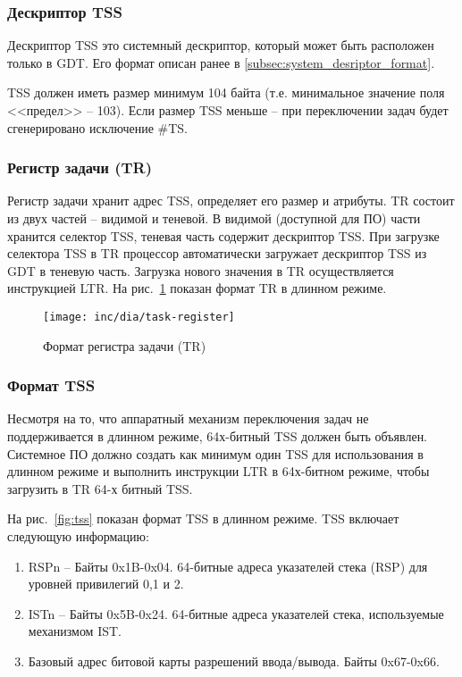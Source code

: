 \subsubsection*{Дескриптор TSS}
Дескриптор TSS это системный дескриптор, который может быть расположен только
в GDT. Его формат описан ранее в \ref{subsec:system_desriptor_format}.

TSS должен иметь размер минимум 104 байта (т.е. минимальное значение поля <<предел>> -- 103).
Если размер TSS меньше -- при переключении задач будет сгенерировано исключение \#TS.

\subsubsection*{Регистр задачи (TR)}
Регистр задачи хранит адрес TSS, определяет его размер и атрибуты. TR состоит
из двух частей -- видимой и теневой. В видимой (доступной для ПО) части хранится селектор TSS,
теневая часть содержит дескриптор TSS. При загрузке селектора TSS в TR
процессор автоматически загружает дескриптор TSS из GDT в теневую часть.
Загрузка нового значения в TR осуществляется инструкцией LTR. На
рис.~\ref{fig:task_register} показан формат TR в длинном режиме.

\begin{figure}[ht!]
  \centering
  \texttt{[image: inc/dia/task-register]}
  \caption{Формат регистра задачи (TR)}
  \label{fig:task_register}
\end{figure}

\subsubsection*{Формат TSS}
Несмотря на то, что аппаратный механизм переключения задач не поддерживается в
длинном режиме, 64х-битный TSS должен быть объявлен. Системное ПО должно
создать как минимум один TSS для использования в длинном режиме и
выполнить инструкции LTR в 64х-битном режиме, чтобы загрузить в TR 64-х битный TSS.

На рис.~\ref{fig:tss} показан формат TSS в длинном режиме. TSS включает
следующую информацию:
\begin{enumerate}[1.]
\item RSPn -- Байты 0x1B-0x04. 64-битные адреса указателей стека (RSP) для
	уровней привилегий 0,1 и 2.
\item ISTn -- Байты 0x5B-0x24. 64-битные адреса указателей стека, используемые
	механизмом IST.
\item Базовый адрес битовой карты разрешений ввода/вывода. Байты 0x67-0x66.
\end{enumerate}

